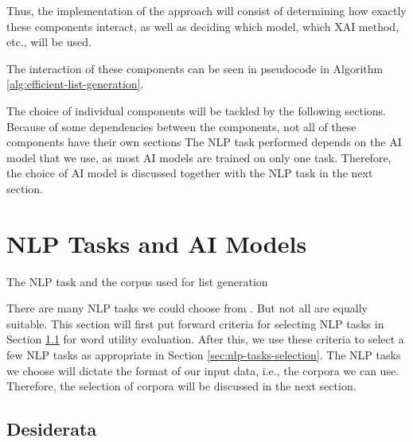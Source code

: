 Thus, the implementation of the approach will consist of determining how exactly these components interact, as well as deciding which model, which XAI method, etc., will be used.

The interaction of these components can be seen in pseudocode in Algorithm \ref{alg:efficient-list-generation}.



The choice of individual components will be tackled by the following sections.
Because of some dependencies between the components, not all of these components have their own sections
The NLP task performed depends on the AI model that we use, as most AI models are trained on only one task.
Therefore, the choice of AI model is discussed together with the NLP task in the next section.


\section{NLP Tasks and AI Models}
The NLP task and the corpus used for list generation

There are many NLP tasks we could choose from .
But not all are equally suitable.
This section will first put forward criteria for selecting NLP tasks in Section \ref{sec:nlp-tasks-desiderata} for word utility evaluation.
After this, we use these criteria to select a few NLP tasks as appropriate in Section \ref{sec:nlp-tasks-selection}.
The NLP tasks we choose will dictate the format of our input data, i.e., the corpora we can use.
Therefore, the selection of corpora will be discussed in the next section.

\subsection{Desiderata} \label{sec:nlp-tasks-desiderata}


